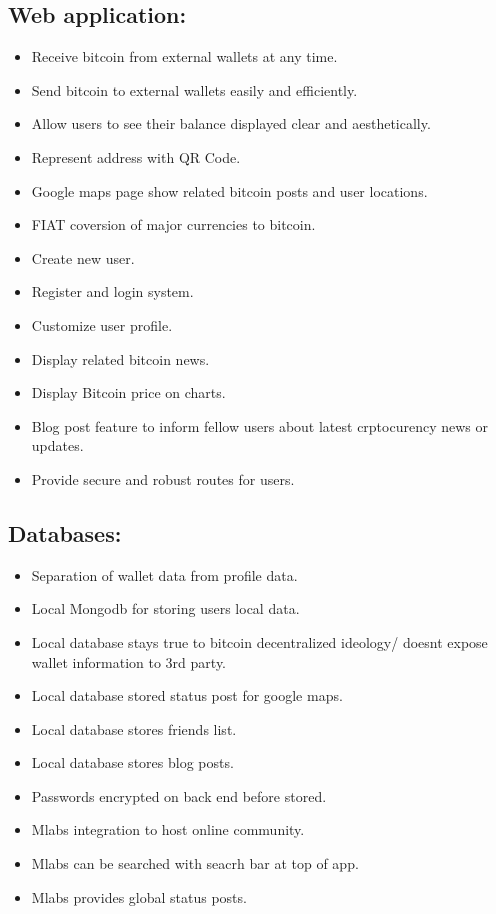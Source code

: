 \subsection{Web application:}
\begin{itemize}
  \item Receive bitcoin from external wallets at any time.
  \item Send bitcoin to external wallets easily and efficiently.
  \item Allow users to see their balance displayed clear and aesthetically.
  \item Represent address with QR Code.
  \item Google maps page show related bitcoin posts and user locations.
  \item FIAT coversion of major currencies to bitcoin.
  \item Create new user.
  \item Register and login system.
  \item Customize user profile.
  \item Display related bitcoin news.
  \item Display Bitcoin price on charts.
  \item Blog post feature to inform fellow users about latest crptocurency news or updates.
  \item Provide secure and robust routes for users.
\end{itemize}

\subsection{Databases:}
\begin{itemize}
  \item Separation of wallet data from profile data.
  \item Local Mongodb for storing users local data.
  \item Local database stays true to bitcoin decentralized ideology/ doesnt expose wallet information to 3rd party.
  \item Local database stored status post for google maps.
  \item Local database stores friends list.
  \item Local database stores blog posts.
  \item Passwords encrypted on back end before stored.
  \item Mlabs integration to host online community.
  \item Mlabs can be searched with seacrh bar at top of app.
  \item Mlabs provides global status posts.
\end{itemize}


